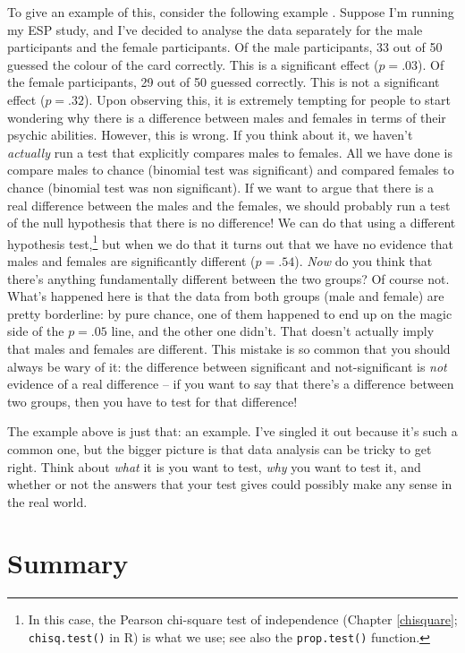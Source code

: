 \documentclass[
]{book}
\begin{document}
To give an example of this, consider the following example \citep[see][]{Gelman2006}. Suppose I'm running my ESP study, and I've decided to analyse the data separately for the male participants and the female participants. Of the male participants, 33 out of 50 guessed the colour of the card correctly. This is a significant effect (\(p = .03\)). Of the female participants, 29 out of 50 guessed correctly. This is not a significant effect (\(p = .32\)). Upon observing this, it is extremely tempting for people to start wondering why there is a difference between males and females in terms of their psychic abilities. However, this is wrong. If you think about it, we haven't \emph{actually} run a test that explicitly compares males to females. All we have done is compare males to chance (binomial test was significant) and compared females to chance (binomial test was non significant). If we want to argue that there is a real difference between the males and the females, we should probably run a test of the null hypothesis that there is no difference! We can do that using a different hypothesis test,\footnote{In this case, the Pearson chi-square test of independence (Chapter \ref{chisquare}; \texttt{chisq.test()} in R) is what we use; see also the \texttt{prop.test()} function.} but when we do that it turns out that we have no evidence that males and females are significantly different (\(p = .54\)). \emph{Now} do you think that there's anything fundamentally different between the two groups? Of course not. What's happened here is that the data from both groups (male and female) are pretty borderline: by pure chance, one of them happened to end up on the magic side of the \(p = .05\) line, and the other one didn't. That doesn't actually imply that males and females are different. This mistake is so common that you should always be wary of it: the difference between significant and not-significant is \emph{not} evidence of a real difference -- if you want to say that there's a difference between two groups, then you have to test for that difference!

The example above is just that: an example. I've singled it out because it's such a common one, but the bigger picture is that data analysis can be tricky to get right. Think about \emph{what} it is you want to test, \emph{why} you want to test it, and whether or not the answers that your test gives could possibly make any sense in the real world.

\hypertarget{summary-4}{%
\section{Summary}\label{summary-4}}
\end{document}
